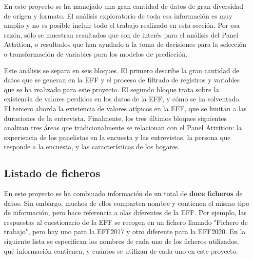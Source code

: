 En este proyecto se ha manejado una gran cantidad de datos de gran diversidad de origen y formato. El análisis exploratorio de toda esa información es muy amplio y no es posible incluir todo el trabajo realizado en esta sección. Por esa razón, sólo se muestran resultados que son de interés para el análisis del Panel Attrition, o resultados que han ayudado a la toma de decisiones para la selección o transformación de variables para los modelos de predicción.

Este análisis se separa en seis bloques. El primero describe la gran cantidad de datos que se generan en la EFF y el proceso de filtrado de registros y variables que se ha realizado para este proyecto. El segundo bloque trata sobre la existencia de valores perdidos en los datos de la EFF, y cómo se ha solventado. El tercero aborda la existencia de valores atípicos en la EFF, que se limitan a las duraciones de la entrevista. Finalmente, los tres últimos bloques siguientes analizan tres áreas que tradicionalmente se relacionan con el Panel Attrition: la experiencia de los panelistas en la encuesta y las entrevistas, la persona que responde a la encuesta, y las características de los hogares.

\subsection*{Listado de ficheros}
\label{section:files}

En este proyecto se ha combinado información de un total de \textbf{doce ficheros} de datos. Sin embargo, muchos de ellos comparten nombre y contienen el mismo tipo de información, pero hace referencia a olas diferentes de la EFF. Por ejemplo, las respuestas al cuestionario de la EFF se recogen en un fichero llamado "Fichero de trabajo", pero hay uno para la EFF2017 y otro diferente para la EFF2020. En la siguiente lista se especifican los nombres de cada uno de los ficheros utilizados, qué información contienen, y cuántos se utilizan de cada uno en este proyecto.

